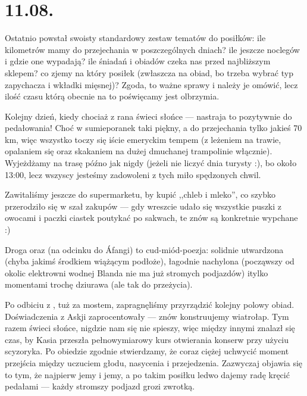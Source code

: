 \chapter*{11.08.}


Ostatnio powstał swoisty standardowy zestaw tematów do posiłków: ile kilometrów mamy do przejechania w poszczególnych dniach? ile jeszcze noclegów i gdzie one wypadają? ile śniadań i obiadów czeka nas przed najbliższym sklepem? co zjemy na który posiłek (zwłaszcza na obiad, bo trzeba wybrać typ zapychacza i wkładki mięsnej)? Zgoda, to ważne sprawy i należy je omówić, lecz ilość czasu którą obecnie na to poświęcamy jest olbrzymia.

Kolejny dzień, kiedy chociaż z rana świeci słońce --- nastraja to pozytywnie do pedałowania! Choć w sumie\textellipsis poranek taki piękny, a do przejechania tylko jakieś 70 km, więc wszystko toczy się iście emeryckim tempem (z leżeniem na trawie, opalaniem się oraz skakaniem na dużej dmuchanej trampolinie włącznie). Wyjeżdżamy na trasę późno jak nigdy (jeżeli nie liczyć dnia turysty :), bo około 13:00, lecz  wszyscy jesteśmy zadowoleni z tych miło spędzonych chwil.


Zawitaliśmy jeszcze do supermarketu, by kupić ,,chleb i mleko'', co szybko przerodziło się w szał zakupów --- gdy wreszcie udało się wszystkie puszki z owocami i paczki ciastek poutykać po sakwach, te znów są konkretnie wypchane :)

Droga  oraz  (na odcinku do Áfangi) to cud-miód-poezja: solidnie utwardzona (chyba jakimś środkiem wiążącym podłoże), łagodnie nachylona (począwszy od okolic elektrowni wodnej Blanda nie ma już stromych podjazdów) i\textellipsis tylko momentami trochę dziurawa (ale tak do przeżycia).

Po odbiciu z , tuż za mostem, zapragnęliśmy przyrządzić kolejny polowy obiad. Doświadczenia z Askji zaprocentowały --- znów konstruujemy wiatrołap. Tym razem świeci słońce, nigdzie nam się nie spieszy, więc między innymi znalazł się czas, by Kasia przeszła pełnowymiarowy kurs otwierania konserw przy użyciu scyzoryka. Po obiedzie zgodnie stwierdzamy, że coraz ciężej uchwycić moment przejścia między uczuciem głodu, nasycenia i przejedzenia. Zazwyczaj objawia się to tym, że najpierw jemy i jemy, a po takim posiłku ledwo dajemy radę kręcić pedałami --- każdy stromszy podjazd grozi zwrotką.

